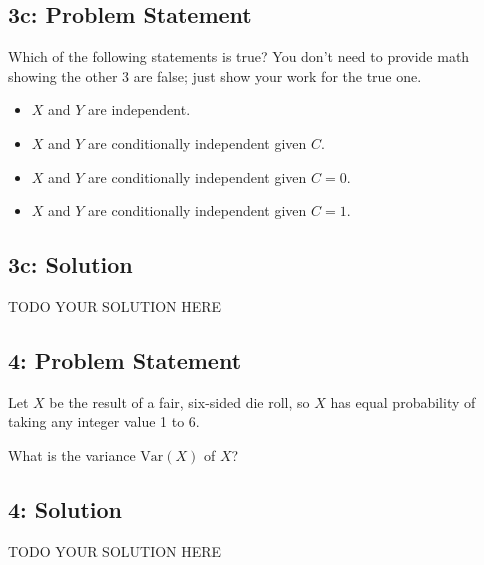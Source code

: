 \documentclass[10pt]{article}
\newcommand{\officialdirections}[1]{{\color{purple} #1}}
\begin{document}
\newpage
\officialdirections{\subsection*{3c: Problem Statement}
Which of the following statements is true? You don't need to provide math showing the other 3 are false; just show your work for the true one.
\begin{itemize}
\item $X$ and $Y$ are independent.
\item $X$ and $Y$ are conditionally independent given $C$.
\item $X$ and $Y$ are conditionally independent given $C = 0$.
\item $X$ and $Y$ are conditionally independent given $C = 1$.
\end{itemize}
}

\subsection{3c: Solution}

TODO YOUR SOLUTION HERE

\newpage
\officialdirections{
\subsection*{4: Problem Statement}
Let $X$ be the result of a fair, six-sided die roll, so $X$ has equal probability of taking any integer value 1 to 6.

What is the variance $\text{Var}(X)$ of $X$? 
}

\subsection{4: Solution}
TODO YOUR SOLUTION HERE
\end{document}
